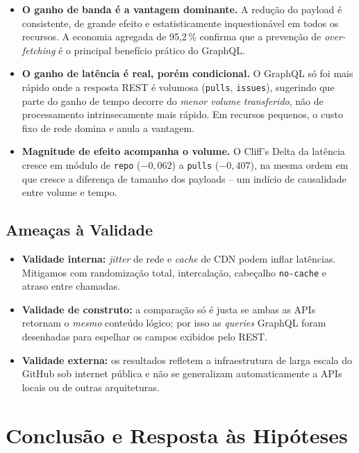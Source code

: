 \documentclass[10pt,a4paper,twocolumn]{article}
\begin{document}
\begin{itemize}
  \item \textbf{O ganho de banda é a vantagem dominante.} A redução do payload
    é consistente, de grande efeito e estatisticamente inquestionável em todos
    os recursos. A economia agregada de 95,2\,\% confirma que a prevenção de
    \textit{over-fetching} é o principal benefício prático do GraphQL.

  \item \textbf{O ganho de latência é real, porém condicional.} O GraphQL só
    foi mais rápido onde a resposta REST é volumosa (\texttt{pulls},
    \texttt{issues}), sugerindo que parte do ganho de tempo decorre do
    \emph{menor volume transferido}, não de processamento intrinsecamente mais
    rápido. Em recursos pequenos, o custo fixo de rede domina e anula a
    vantagem.

  \item \textbf{Magnitude de efeito acompanha o volume.} O Cliff's Delta da
    latência cresce em módulo de \texttt{repo} ($-0,062$) a \texttt{pulls}
    ($-0,407$), na mesma ordem em que cresce a diferença de tamanho dos
    payloads -- um indício de causalidade entre volume e tempo.
\end{itemize}

\subsection{Ameaças à Validade}

\begin{itemize}
  \item \textbf{Validade interna:} \textit{jitter} de rede e \textit{cache} de
    CDN podem inflar latências. Mitigamos com randomização total, intercalação,
    cabeçalho \texttt{no-cache} e atraso entre chamadas.
  \item \textbf{Validade de construto:} a comparação só é justa se ambas as
    APIs retornam o \emph{mesmo} conteúdo lógico; por isso as \textit{queries}
    GraphQL foram desenhadas para espelhar os campos exibidos pelo REST.
  \item \textbf{Validade externa:} os resultados refletem a infraestrutura de
    larga escala do GitHub sob internet pública e não se generalizam
    automaticamente a APIs locais ou de outras arquiteturas.
\end{itemize}

\section{Conclusão e Resposta às Hipóteses}
\end{document}
